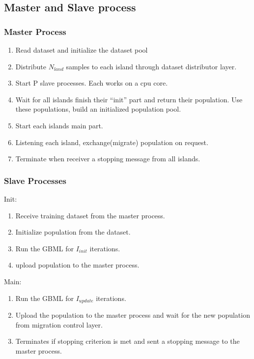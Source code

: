 \documentclass[conference]{IEEEtran}
\begin{document}
  \subsection{Master and Slave process}
  \subsubsection{Master Process}
  
  \begin{enumerate}[leftmargin=4\parindent]
    \item Read dataset and initialize the dataset pool
    \item Distribute $N_{land}$ samples to each island through dataset distributor layer.
    \item Start P slave processes. Each works on a cpu core.
    \item Wait for all islands finish their “init” part and return their population. Use these populations, build an initialized population pool.
    \item Start each islands main part.
    \item Listening each island, exchange(migrate) population on request.
    \item Terminate when receiver a stopping message from all islands.
  \end{enumerate}

  \subsubsection{Slave Processes}\mbox{}
  
  Init:
  \begin{enumerate}[leftmargin =4\parindent]
  \item Receive training dataset from the master process.
  \item Initialize population from the dataset.
  \item Run the GBML for $I_{init}$ iterations.
  \item upload population to the master process.
  \end{enumerate}

  Main:
  \begin{enumerate}[leftmargin=4\parindent]
  \item Run the GBML for $I_{update}$ iterations.
  \item Upload the population to the master process and wait for the new population from migration control layer.
  \item Terminates if stopping criterion is met and sent a stopping message to the master process.
  \end{enumerate}
\end{document}
